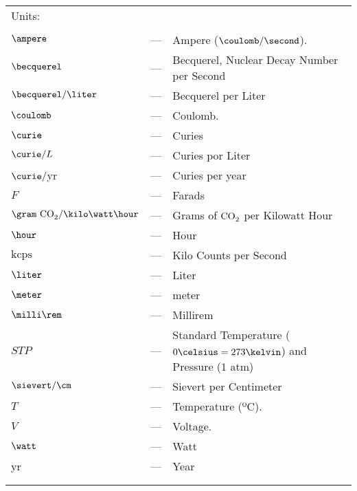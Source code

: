 \begin{longtable}{p{25mm} c p{120mm} }
\multicolumn{3}{l}{Units:}\\
\\
$\ampere$ & --- & Ampere ($\coulomb/\second$).\\
$\becquerel$ & --- & Becquerel, Nuclear Decay Number per Second\\
$\becquerel/\liter$ & --- & Becquerel per Liter\\
$\coulomb$ & --- & Coulomb.\\
$\curie$ & --- & Curies\\
$\curie/L$ & --- & Curies por Liter\\
$\curie/$yr & --- & Curies per year\\
$F$ & --- & Farads\\
$\gram~\ce{CO_2} /\kilo\watt\hour$ & --- & Grams of $\ce{CO_2}$ per Kilowatt Hour\\
$\hour$ & --- & Hour\\
$\text{kcps}$ & --- & Kilo Counts per Second\\
$\liter$ & --- & Liter\\
$\meter$ & --- & meter\\
$\milli\rem$ & --- & Millirem\\
$STP$ & --- & Standard Temperature ($0\celsius=273\kelvin$) and 
\newline
Pressure ($1$ atm)\\
$\sievert/\cm$ & --- & Sievert per Centimeter\\
$T$ & --- & Temperature (ºC).\\
$V$ & --- & Voltage.\\
$\watt$ & --- & Watt\\
yr & --- & Year\\
\\
\\
\end{longtable}
